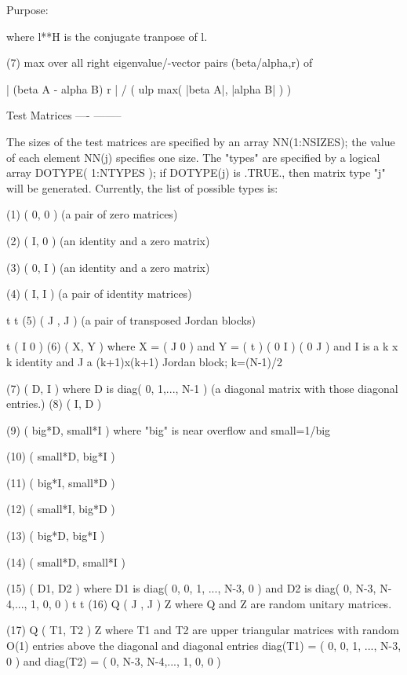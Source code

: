 \begin{DoxyParagraph}{Purpose\+: }
\begin{DoxyVerb}
       where l**H is the conjugate tranpose of l.

 (7)   max over all right eigenvalue/-vector pairs (beta/alpha,r) of

       | (beta A - alpha B) r | / ( ulp max( |beta A|, |alpha B| ) )

 Test Matrices
 ---- --------

 The sizes of the test matrices are specified by an array
 NN(1:NSIZES); the value of each element NN(j) specifies one size.
 The "types" are specified by a logical array DOTYPE( 1:NTYPES ); if
 DOTYPE(j) is .TRUE., then matrix type "j" will be generated.
 Currently, the list of possible types is:

 (1)  ( 0, 0 )         (a pair of zero matrices)

 (2)  ( I, 0 )         (an identity and a zero matrix)

 (3)  ( 0, I )         (an identity and a zero matrix)

 (4)  ( I, I )         (a pair of identity matrices)

         t   t
 (5)  ( J , J  )       (a pair of transposed Jordan blocks)

                                     t                ( I   0  )
 (6)  ( X, Y )         where  X = ( J   0  )  and Y = (      t )
                                  ( 0   I  )          ( 0   J  )
                       and I is a k x k identity and J a (k+1)x(k+1)
                       Jordan block; k=(N-1)/2

 (7)  ( D, I )         where D is diag( 0, 1,..., N-1 ) (a diagonal
                       matrix with those diagonal entries.)
 (8)  ( I, D )

 (9)  ( big*D, small*I ) where "big" is near overflow and small=1/big

 (10) ( small*D, big*I )

 (11) ( big*I, small*D )

 (12) ( small*I, big*D )

 (13) ( big*D, big*I )

 (14) ( small*D, small*I )

 (15) ( D1, D2 )        where D1 is diag( 0, 0, 1, ..., N-3, 0 ) and
                        D2 is diag( 0, N-3, N-4,..., 1, 0, 0 )
           t   t
 (16) Q ( J , J ) Z     where Q and Z are random unitary matrices.

 (17) Q ( T1, T2 ) Z    where T1 and T2 are upper triangular matrices
                        with random O(1) entries above the diagonal
                        and diagonal entries diag(T1) =
                        ( 0, 0, 1, ..., N-3, 0 ) and diag(T2) =
                        ( 0, N-3, N-4,..., 1, 0, 0 )


\end{DoxyVerb}
\end{DoxyParagraph}
